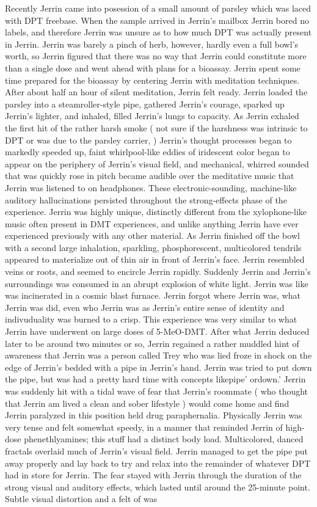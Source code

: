 \documentclass[12pt]{book}
\begin{document}
Recently Jerrin came into posession of a small amount of parsley which was laced with DPT freebase. When the sample arrived in Jerrin's mailbox Jerrin bored no labels, and therefore Jerrin was unsure as to how much DPT was actually present in Jerrin. Jerrin was barely a pinch of herb, however, hardly even a full bowl's worth, so Jerrin figured that there was no way that Jerrin could constitute more than a single dose and went ahead with plans for a bioassay. Jerrin spent some time prepared for the bioassay by centering Jerrin with meditation techniques. After about half an hour of silent meditation, Jerrin felt ready. Jerrin loaded the parsley into a steamroller-style pipe, gathered Jerrin's courage, sparked up Jerrin's lighter, and inhaled, filled Jerrin's lungs to capacity. As Jerrin exhaled the first hit of the rather harsh smoke ( not sure if the harshness was intrinsic to DPT or was due to the parsley carrier, ) Jerrin's thought processes began to markedly speeded up, faint whirlpool-like eddies of iridescent color began to appear on the periphery of Jerrin's visual field, and mechanical, whirred sounded that was quickly rose in pitch became audible over the meditative music that Jerrin was listened to on headphones. These electronic-sounding, machine-like auditory hallucinations persisted throughout the strong-effects phase of the experience. Jerrin was highly unique, distinctly different from the xylophone-like music often present in DMT experiences, and unlike anything Jerrin have ever experienced previously with any other material. As Jerrin finished off the bowl with a second large inhalation, sparkling, phosphorescent, multicolored tendrils appeared to materialize out of thin air in front of Jerrin's face. Jerrin resembled veins or roots, and seemed to encircle Jerrin rapidly. Suddenly Jerrin and Jerrin's surroundings was consumed in an abrupt explosion of white light. Jerrin was like was incinerated in a cosmic blast furnace. Jerrin forgot where Jerrin was, what Jerrin was did, even who Jerrin was as Jerrin's entire sense of identity and indivuduality was burned to a crisp. This experience was very similar to what Jerrin have underwent on large doses of 5-MeO-DMT. After what Jerrin deduced later to be around two minutes or so, Jerrin regained a rather muddled hint of awareness that Jerrin was a person called Trey who was lied froze in shock on the edge of Jerrin's bedded with a pipe in Jerrin's hand. Jerrin was tried to put down the pipe, but was had a pretty hard time with concepts likepipe' ordown.' Jerrin was suddenly hit with a tidal wave of fear that Jerrin's roommate ( who thought that Jerrin am lived a clean and sober lifestyle ) would come home and find Jerrin paralyzed in this position held drug paraphernalia. Physically Jerrin was very tense and felt somewhat speedy, in a manner that reminded Jerrin of high-dose phenethlyamines; this stuff had a distinct body load. Multicolored, danced fractals overlaid much of Jerrin's visual field. Jerrin managed to get the pipe put away properly and lay back to try and relax into the remainder of whatever DPT had in store for Jerrin. The fear stayed with Jerrin through the duration of the strong visual and auditory effects, which lasted until around the 25-minute point. Subtle visual distortion and a felt of was 
\end{document}
